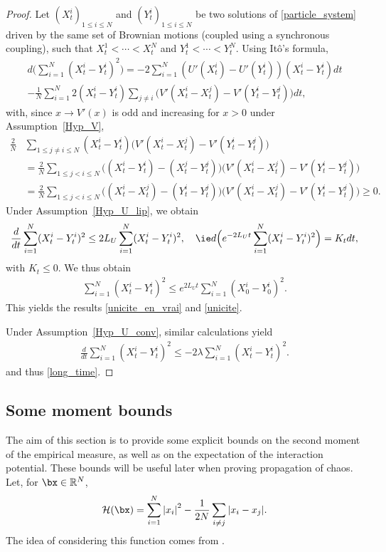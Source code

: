 \begin{proof}

Let $(X^i_t)_{1\leq i\leq N}$ and $(Y^i_t)_{1\leq i\leq N}$ be two solutions of \eqref{particle_system} driven by the same set of Brownian motions (\ie coupled using a synchronous coupling), such that \hbox{$X^1_t<\cdots<X^N_t$} and $Y^1_t<\cdots<Y^N_t$. Using Itô's formula,
\begin{multline*}
d\biggl(\sum_{i=1}^N(X^i_t-Y^i_t)^2\biggr)=-2\sum_{i=1}^N\left(U'(X^i_t)-U'(Y^i_t)\right)(X^i_t-Y^i_t)dt\\[-5pt]
-\frac{1}{N}\sum_{i=1}^N2(X^i_t-Y^i_t)\sum_{j\neq i}\bigl(V'(X^i_t-X^j_t)-V'(Y^i_t-Y^j_t)\bigr)dt,
\end{multline*}
with, since $x\to V'(x)$ is odd and increasing for $x>0$ under Assumption~\ref{Hyp_V},
\begin{align*}
\frac{2}{N}&\sum_{1\leq j\neq i\leq N}(X^i_t-Y^i_t)\bigl(V'(X^i_t-X^j_t)-V'(Y^i_t-Y^j_t)\bigr)\\
&=\frac{2}{N}\sum_{1\leq j<i\leq N}\bigl((X^i_t-Y^i_t)-(X^j_t-Y^j_t)\bigr)\bigl(V'(X^i_t-X^j_t)-V'(Y^i_t-Y^j_t)\bigr)\\
&=\frac{2}{N}\sum_{1\leq j<i\leq N}\bigl((X^i_t-X^j_t)-(Y^i_t-Y^j_t)\bigr)\bigl(V'(X^i_t-X^j_t)-V'(Y^i_t-Y^j_t)\bigr)\geq0.
\end{align*}
Under Assumption~\ref{Hyp_U_lip}, we obtain
\[
\frac{d}{dt}\sum_{i=1}^N(X^i_t-Y^i_t)^2\leq 2L_U\sum_{i=1}^N (X^i_t-Y^i_t)^2,
\quad\text{\ie}
d \Bigl(e^{-2L_U t}\sum_{i=1}^N(X^i_t-Y^i_t)^2\Bigr)=K_tdt,
\]
with $K_t\leq0$. We thus obtain
\begin{align*}
\sum_{i=1}^N(X^i_t-Y^i_t)^2\leq e^{2L_U t}\sum_{i=1}^N(X^i_0-Y^i_0)^2.
\end{align*}
This yields the results \eqref{unicite_en_vrai} and \eqref{unicite}.

Under Assumption~\ref{Hyp_U_conv}, similar calculations yield
\begin{align*}
\frac{d}{dt}\sum_{i=1}^N(X^i_t-Y^i_t)^2\leq-2\lambda\sum_{i=1}^N (X^i_t-Y^i_t)^2.
\end{align*}
and thus \eqref{long_time}.
\end{proof}

\subsection{Some moment bounds}\label{sec_bornes}

The aim of this section is to provide some explicit bounds on the second moment of the empirical measure, as well as on the expectation of the interaction potential. These bounds will be useful later when proving propagation of chaos. Let, for $\bx\in\mathbb{R}^N$,
\begin{equation}\label{def_H_cal}
\mathcal{H}(\bx)=\sum_{i=1}^N\left|x_i\right|^2-\frac{1}{2N}\sum_{i\neq j}|x_i-x_j|.
\end{equation}
The idea of considering this function comes from \cite{lu_mattingly}.

